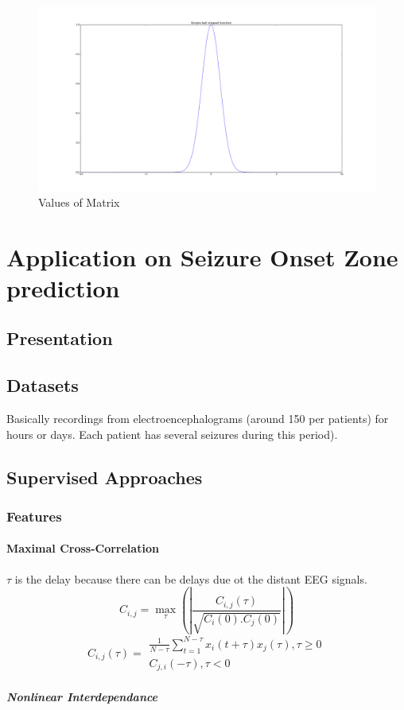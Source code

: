 \documentclass[a4paper]{report}
\begin{document}
\begin{figure}[H]
\begin{center}
\includegraphics[scale=0.21]{gaussian.png}
\caption{Values of Matrix}
\end{center}
\end{figure}

\part{Application on Seizure Onset Zone prediction}
\chapter{Presentation}
\chapter{Datasets}
Basically recordings from electroencephalograms (around 150 per patients) for hours or days. Each patient has several seizures during this period).
\chapter{Supervised Approaches}
\section{Features}
\subsection{Maximal Cross-Correlation}
$\tau$ is the delay because there can be delays due ot the distant EEG signals.
\[
C_{i,j}=\max_\tau \left( |\frac{C_{i,j}(\tau)}{\sqrt{C_i(0).C_j(0)}} |  \right)
\]
\[
C_{i,j}(\tau)=
\begin{matrix}
\frac{1}{N-\tau}\sum_{t=1}^{N-\tau}x_i(t+ \tau)x_j(\tau),\tau \geq 0 \\
C_{j,i}(-\tau), \tau<0
\end{matrix}
\]
\subsubsection{Nonlinear Interdependance}
	
\end{document}
